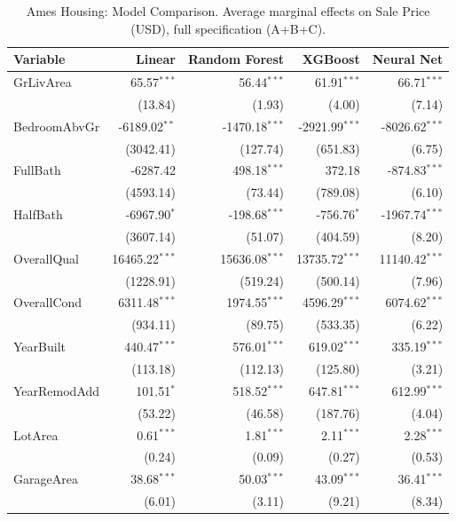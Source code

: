 \documentclass[12pt]{article}
\begin{document}
	\begin{table}[htbp]
		\centering
		\small
		\begin{threeparttable}
			\caption{Ames Housing: Model Comparison. Average marginal effects on Sale Price (USD), full specification (A+B+C).}
			\label{tab:ames_housing_model_comparison}
			\begin{tabular}{lrrrr}
				\toprule
				Variable & Linear & Random Forest & XGBoost & Neural Net \\
				\midrule
				GrLivArea & 65.57$^{***}$ & 56.44$^{***}$ & 61.91$^{***}$ & 66.71$^{***}$ \\
				& (13.84) & (1.93) & (4.00) & (7.14) \\
				BedroomAbvGr & -6189.02$^{**}$ & -1470.18$^{***}$ & -2921.99$^{***}$ & -8026.62$^{***}$ \\
				& (3042.41) & (127.74) & (651.83) & (6.75) \\
				FullBath & -6287.42 & 498.18$^{***}$ & 372.18 & -874.83$^{***}$ \\
				& (4593.14) & (73.44) & (789.08) & (6.10) \\
				HalfBath & -6967.90$^{*}$ & -198.68$^{***}$ & -756.76$^{*}$ & -1967.74$^{***}$ \\
				& (3607.14) & (51.07) & (404.59) & (8.20) \\
				\midrule
				OverallQual & 16465.22$^{***}$ & 15636.08$^{***}$ & 13735.72$^{***}$ & 11140.42$^{***}$ \\
				& (1228.91) & (519.24) & (500.14) & (7.96) \\
				OverallCond & 6311.48$^{***}$ & 1974.55$^{***}$ & 4596.29$^{***}$ & 6074.62$^{***}$ \\
				& (934.11) & (89.75) & (533.35) & (6.22) \\
				YearBuilt & 440.47$^{***}$ & 576.01$^{***}$ & 619.02$^{***}$ & 335.19$^{***}$ \\
				& (113.18) & (112.13) & (125.80) & (3.21) \\
				YearRemodAdd & 101.51$^{*}$ & 518.52$^{***}$ & 647.81$^{***}$ & 612.99$^{***}$ \\
				& (53.22) & (46.58) & (187.76) & (4.04) \\
				\midrule
				LotArea & 0.61$^{***}$ & 1.81$^{***}$ & 2.11$^{***}$ & 2.28$^{***}$ \\
				& (0.24) & (0.09) & (0.27) & (0.53) \\
				GarageArea & 38.68$^{***}$ & 50.03$^{***}$ & 43.09$^{***}$ & 36.41$^{***}$ \\
				& (6.01) & (3.11) & (9.21) & (8.34) \\

\end{tabular}
\end{threeparttable}
\end{table}
\end{document}

